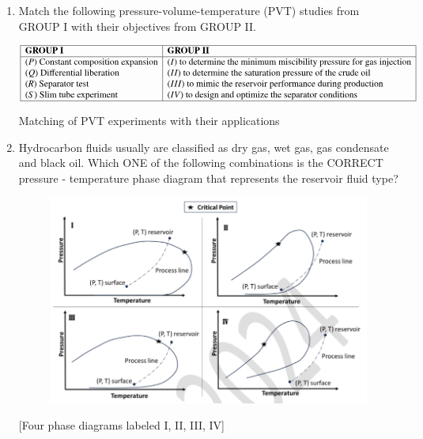 \documentclass[journal,12pt,onecolumn]{IEEEtran}
\theoremstyle{remark}
\begin{document}
\begin{enumerate}
\item  Match the following pressure-volume-temperature (PVT) studies from GROUP I with their objectives from GROUP II.

\begin{table}[h!]
\centering
\[
\begin{array}{|l|l|}
\hline
\textbf{GROUP I} & \textbf{GROUP II} \\
\hline
(P)\ \text{Constant composition expansion} & (I)\ \text{to determine the minimum miscibility pressure for gas injection} \\
(Q)\ \text{Differential liberation} & (II)\ \text{to determine the saturation pressure of the crude oil} \\
(R)\ \text{Separator test} & (III)\ \text{to mimic the reservoir performance during production} \\
(S)\ \text{Slim tube experiment} & (IV)\ \text{to design and optimize the separator conditions} \\
\hline
\end{array}
\]
\caption{Matching of PVT experiments with their applications}
\label{tab:pvt}
\end{table}
\begin{enumerate}
\end{enumerate}
\hfill{}
\item  Hydrocarbon fluids usually are classified as dry gas, wet gas, gas condensate and black oil. Which ONE of the following combinations is the CORRECT pressure - temperature phase diagram that represents the reservoir fluid type?
\begin{figure}[h]
    \centering
    \includegraphics[width=0.5\columnwidth]{figs/im 8.jpeg}
    \caption{}
    \label{fig:placeholder}
\end{figure}
[Four phase diagrams labeled I, II, III, IV]


\end{enumerate}
\end{document}
